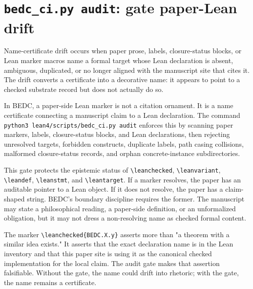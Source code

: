 \section{\texttt{bedc\_ci.py audit}: gate paper-Lean drift}
\label{sec:audit-gates-paper-lean-drift}

\begin{definition}
\label{def:audit-gates-name-certificate-drift}
Name-certificate drift occurs when paper prose, labels, closure-status blocks, or Lean marker macros name a formal target whose Lean declaration is absent, ambiguous, duplicated, or no longer aligned with the manuscript site that cites it. The drift converts a certificate into a decorative name: it appears to point to a checked substrate record but does not actually do so.
\end{definition}

\begin{principle}
\label{prin:audit-gates-name-resolves}
In BEDC, a paper-side Lean marker is not a citation ornament. It is a name certificate connecting a manuscript claim to a Lean declaration. The command \texttt{python3 lean4/scripts/bedc\_ci.py audit} enforces this by scanning paper markers, labels, closure-status blocks, and Lean declarations, then rejecting unresolved targets, forbidden constructs, duplicate labels, path casing collisions, malformed closure-status records, and orphan concrete-instance subdirectories.
\end{principle}

This gate protects the epistemic status of \texttt{\textbackslash leanchecked}, \texttt{\textbackslash leanvariant}, \texttt{\textbackslash leandef}, \texttt{\textbackslash leanstmt}, and \texttt{\textbackslash leantarget}. If a marker resolves, the paper has an auditable pointer to a Lean object. If it does not resolve, the paper has a claim-shaped string. BEDC's boundary discipline requires the former. The manuscript may state a philosophical reading, a paper-side definition, or an unformalized obligation, but it may not dress a non-resolving name as checked formal content.

\begin{example}
\label{ex:audit-gates-marker-namecert}
The marker \texttt{\textbackslash leanchecked\{BEDC.X.y\}} asserts more than "a theorem with a similar idea exists." It asserts that the exact declaration name is in the Lean inventory and that this paper site is using it as the canonical checked implementation for the local claim. The audit gate makes that assertion falsifiable. Without the gate, the name could drift into rhetoric; with the gate, the name remains a certificate.
\end{example}

